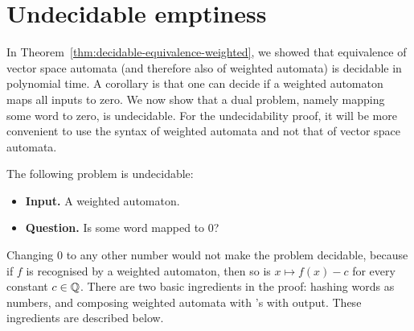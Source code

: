 %
%
%
%

\section{Undecidable emptiness}
\label{sec:undecidable-emptiness}
In Theorem~\ref{thm:decidable-equivalence-weighted}, we showed that equivalence of vector space automata (and therefore also of weighted automata) is decidable in polynomial time. A corollary is that one can decide if a weighted automaton maps all inputs to zero. We now show that a dual problem, namely mapping some word to zero, is undecidable. For the undecidability proof, it will be more convenient to use the syntax of weighted automata and not that of vector space automata.
\begin{theorem}\label{thm:undecidable-weighted}
The following problem is undecidable:
\begin{itemize}
	\item {\bf Input.} A weighted automaton.
	\item {\bf Question.} Is some word mapped to $0$?
\end{itemize}	
\end{theorem}
Changing $0$ to any other number would not make the problem decidable, because if $f$ is recognised by a weighted automaton, then so is $x \mapsto f(x) - c$ for every constant $c \in \mathbb Q$. 
There are two basic ingredients in the proof: hashing words as numbers, and composing weighted automata with \nfa's with output. These ingredients are described below.



